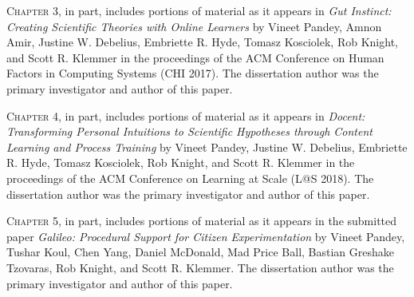 \begin{frontmatter}
\begin{acknowledgements}
\textsc{Chapter 3}, in part, includes portions of material as it appears in \emph{Gut Instinct: Creating Scientific Theories with Online Learners} by Vineet Pandey, Amnon Amir, Justine W. Debelius, Embriette R. Hyde, Tomasz Kosciolek, Rob Knight, and Scott R. Klemmer in the proceedings of the ACM Conference on Human Factors in Computing Systems (CHI 2017). The dissertation author was the primary investigator and author of this paper.

\textsc{Chapter 4}, in part, includes portions of material as it appears in \emph{Docent: Transforming Personal Intuitions to Scientific Hypotheses through Content Learning and Process Training} by Vineet Pandey, Justine W. Debelius, Embriette R. Hyde, Tomasz Kosciolek, Rob Knight, and Scott R. Klemmer in the proceedings of the ACM Conference on Learning at Scale (L@S 2018). The dissertation author was the primary investigator and author of this paper.

\textsc{Chapter 5}, in part, includes portions of material as it appears in  the submitted paper \emph{Galileo: Procedural Support for Citizen Experimentation} by Vineet Pandey, Tushar Koul, Chen Yang, Daniel McDonald, Mad Price Ball, Bastian Greshake Tzovaras, Rob Knight, and Scott R. Klemmer. The dissertation author was the primary investigator and author of this paper.

\end{acknowledgements}


\end{frontmatter}
